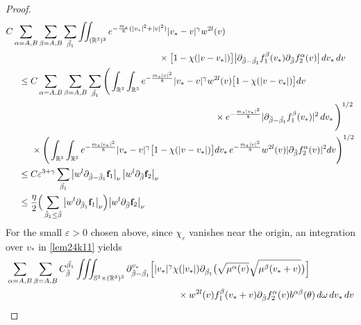 \documentclass[reqno]{amsart}
\numberwithin{equation}{section}
\numberwithin{equation}{section}
\begin{document}
\begin{proof}
		\begin{align*}
			&C\sum_{\alpha=A,B}\sum_{\beta=A,B}\sum_{\tilde{\beta_1}}\iint_{(\mathbb{R}^3)^2} e^{-\frac{m_s}{8}(|v_*|^2+|v|^2)}|v_*-v|^\gamma w^{2l}(v) \\
			&\hspace{6cm}\times\big[1-\chi(|v-v_{*}|)\big]\big|\partial_{\tilde{\beta}-\tilde{\beta_1}}f^\beta_1(v_*)\partial_{\tilde{\beta}}f^\alpha_2(v)\big| \, dv_*\,dv \\
			&\hspace{0.5cm}\leq C\sum_{\alpha=A,B}\sum_{\beta=A,B}\sum_{\tilde{\beta_1}}\Bigg(\int_{\mathbb{R}^3} \int_{\mathbb{R}^3}e^{-\frac{m_s|v|^2}{8}}|v_*-v|^\gamma w^{2l}(v)\big[1-\chi(|v-v_{*}|)\big] dv \\
			&\hspace{8.2cm}\times e^{-\frac{m_s|v_*|^2}{8}}|\partial_{\tilde{\beta}-\tilde{\beta_1}}f^\beta_1(v_*)|^2 \, dv_*\,\Bigg)^{1/2}\\
			&\hspace{1cm} \times \Bigg(\int_{\mathbb{R}^3} \int_{\mathbb{R}^3}e^{-\frac{m_s|v_*|^2}{8}}|v_*-v|^\gamma \big[1-\chi(|v-v_{*}|)\big] dv_* \,e^{-\frac{m_s|v|^2}{8}}w^{2l}(v)|\partial_{\tilde{\beta}}f^\alpha_2(v)|^2 dv\Bigg)^{1/2}\\
			&\hspace{0.5cm}\leq  C \varepsilon^{3+\gamma}\sum_{\tilde{\beta_1}}\big|w^{l}\partial_{\tilde{\beta}-\tilde{\beta}_1}\mathbf{f}_1\big|_{\nu}\,\big|w^{l}\partial_{\tilde{\beta}}\mathbf{f}_2\big|_{\nu}\\ &\hspace{0.5cm}\leq \frac{\eta}{2}\Big(\sum_{\tilde{\beta}_1\leq\tilde{\beta}}\big|w^{l}\partial_{\tilde{\beta}_1}\mathbf{f}_1\big|_{\nu}\Big)\big|w^{l}\partial_{\tilde{\beta}}\mathbf{f}_2\big|_{\nu}
		\end{align*}
		For the small $\varepsilon>0$ chosen above, since $\chi_{\varepsilon}$ vanishes near the origin, an integration over $v_*$ in \eqref{lem24k11} yields
		\begin{align*}
			& \sum_{\alpha=A,B}\sum_{\beta=A,B} C_{\tilde{\beta}}^{\tilde{\beta_1}} \iiint_{\mathbb{S}^2\times(\mathbb{R}^3)^2} \partial_{\tilde{\beta}-\tilde{\beta_1}}^{v_*}\Big[|v_*|^\gamma \chi(|v_{*}|) \partial_{\tilde{\beta_1}}\big(\sqrt{\mu^\alpha(v)} \sqrt{\mu^\beta(v_*+v)}\big)\Big]\\
			&\hspace{6.5cm}\times w^{2l}(v)f^\beta_1(v_*+v)\partial_{\tilde{\beta}}f^\alpha_2(v)b^{\alpha \beta}(\theta)\,d\omega \, dv_*\,dv \\

\end{align*}
\end{proof}
\end{document}
